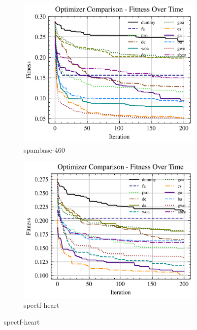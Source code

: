 \begin{figure}[htp]
    \centering
    \begin{subfigure}[htp]{0.45\textwidth}
        \includegraphics[width=\textwidth]{imagenes/fitness_charts/img/real/spambase-460/optimizers_fitness_svc.png}
        \caption{spambase-460}
    \end{subfigure}
    \begin{subfigure}[htp]{0.45\textwidth}
        \includegraphics[width=\textwidth]{imagenes/fitness_charts/img/real/spectf-heart/optimizers_fitness_svc.png}
        \caption{spectf-heart}
    \end{subfigure}

\end{figure}
